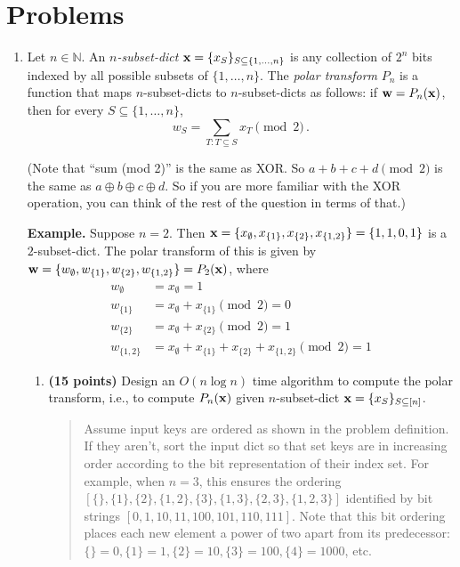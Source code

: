 \documentclass[11pt]{article}
\begin{document}
\section*{Problems}
\begin{enumerate}

\item Let $n\in\mathbb{N}$. An \emph{$n$-subset-dict} ${\bf x} = \{x_S\}_{S\subseteq\{1,\ldots,n\}}$ is any collection of $2^n$ bits indexed by all possible subsets of $\{1,\ldots,n\}$. The \emph{polar transform} $P_n$ is a function that maps $n$-subset-dicts to $n$-subset-dicts as follows: if ${\bf w} = P_n({\bf x})$, then for every $S\subseteq\{1,\ldots,n\}$, 
\begin{equation}
    w_S = \sum_{T: T\subseteq S} x_T \pmod{2}\,.
\end{equation}

(Note that ``sum (mod 2)'' is the same as XOR. So $a+ b+c + d \pmod{2}$ is the same as $a \oplus b \oplus c \oplus d$. So if you are more familiar with the XOR operation, you can think of the rest of the question in terms of that.)

{\bf Example.}
    Suppose $n = 2$. Then ${\bf x} = \{x_\emptyset, x_{\{1\}}, x_{\{2\}}, x_{\{1,2\}}\} = \{1,1,0,1\}$ is a $2$-subset-dict. The polar transform of this is given by ${\bf w} = \{w_\emptyset, w_{\{1\}}, w_{\{2\}}, w_{\{1,2\}}\} = P_2({\bf x})$, where
    \begin{align}
        w_\emptyset &= x_\emptyset = 1 \\
        w_{\{1\}} &= x_{\emptyset} + x_{\{1\}} \pmod{2} = 0 \\
        w_{\{2\}} &= x_\emptyset + x_{\{2\}} \pmod{2} = 1\\
        w_{\{1,2\}} &= x_\emptyset + x_{\{1\}} + x_{\{2\}} + x_{\{1,2\}} \pmod{2} = 1
    \end{align}



\begin{enumerate}
    \item 
    {\bf (15 points)}
    Design an $O(n \log n)$ time algorithm to compute the polar transform, i.e., to compute $P_n({\bf x})$ given $n$-subset-dict ${\bf x} = \{x_S\}_{S\subseteq [n]}$. 
    \begin{quote}
      \color{purple}
      Assume input keys are ordered as shown in the problem definition. If they aren't, sort the input dict so that set keys are in increasing order according to the bit representation of their index set. For example, when $n = 3$, this ensures the ordering $[\{\}, \{1\}, \{2\}, \{1, 2\}, \{3\}, \{1, 3\}, \{2, 3\}, \{1, 2, 3\}]$ identified by bit strings $[0, 1, 10, 11, 100, 101, 110, 111]$. Note that this bit ordering places each new element a power of two apart from its predecessor: $\{\} = 0, \{1\} = 1, \{2\} = 10, \{3\} = 100, \{4\} = 1000$, etc.


\end{quote}
\end{enumerate}
\end{enumerate}
\end{document}
